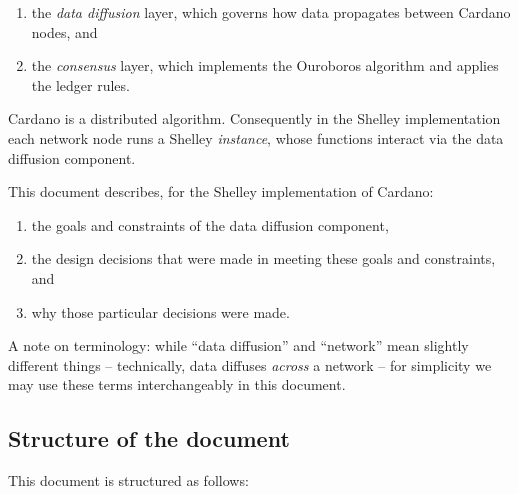 \documentclass[11pt,a4paper]{article}
\begin{document}
\begin{enumerate}
\item
  the \emph{data diffusion} layer, which governs how data propagates
  between Cardano nodes, and
\item
  the \emph{consensus} layer, which implements the Ouroboros algorithm
  and applies the ledger rules.
\end{enumerate}

Cardano is a distributed algorithm. Consequently in the Shelley
implementation each network node runs a Shelley \emph{instance}, whose
functions interact via the data diffusion component.

This document describes, for the Shelley implementation of Cardano:

\begin{enumerate}
\item
  the goals and constraints of the data diffusion component,
\item
  the design decisions that were made in meeting these goals and
  constraints, and
\item
  why those particular decisions were made.
\end{enumerate}

A note on terminology: while ``data diffusion'' and ``network'' mean
slightly different things -- technically, data diffuses \emph{across} a
network -- for simplicity we may use these terms interchangeably in this
document.

\subsection{Structure of the document}
\label{structure-of-the-document}

This document is structured as follows:
\end{document}
